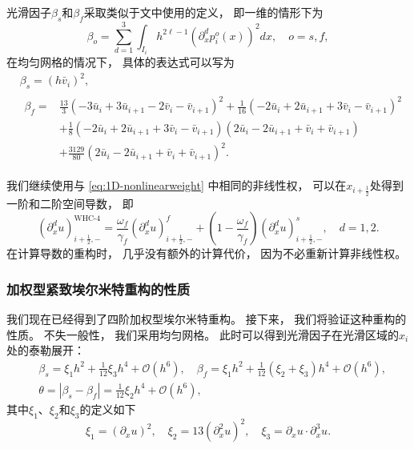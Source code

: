 光滑因子$\beta_{{s}}$和$\beta_{{f}}$采取类似于文\cite{WENO-1996}中使用的定义，
即一维的情形下为
\begin{equation}
  \beta_{{o}}= \sum_{d=1}^3 \int_{I_{i}}h^{2\ell-1}\left({\partial_{x}^{d}}p^{{o}}_{i}(x)\right)^2 dx, \quad {{o}}={{s}},{{f}},
\end{equation}
在均匀网格的情况下，
具体的表达式可以写为
\begin{align}
   & \beta_{{s}}=
  (h \bar v_{i})^2,                                                                                                                                            \\
   & \begin{aligned}
       \beta_{{f}}=
        & \frac{13}{3}\left(-3 \bar u_{i}+ 3 \bar u_{i+1}- 2 \bar v_{i}-\bar v_{i+1}\right)^2 +
       \frac{1}{16}\left(-2 \bar u_{i}+ 2 \bar u_{i+1}+ 3 \bar v_{i}-\bar v_{i+1}\right)^2                                                                    \\
        & + \frac{1}{8}\left(-2 \bar u_{i}+ 2 \bar u_{i+1}+ 3 \bar v_{i}-\bar v_{i+1}\right)\left(2 \bar u_{i}- 2 \bar u_{i+1}+\bar v_{i}+\bar v_{i+1}\right) \\
        & +\frac{3129}{80} \left(2 \bar u_{i}- 2 \bar u_{i+1}+\bar v_{i}+\bar v_{i+1}\right)^2.
     \end{aligned}
\end{align}

我们继续使用与 \cref{eq:1D-nonlinearweight} 中相同的非线性权，
可以在$x_{i+\frac{1}{2}}$处得到一阶和二阶空间导数，
即
\begin{equation}
  \left({\partial_{x}^{d}}u\right)_{i+\frac{1}{2},-}^{\text{WHC-4}}= \frac{\omega_{{f}}}{\gamma_{{f}}}\left({\partial_{x}^{d}}u\right)_{i+\frac{1}{2},-}^{{f}}+ \left(1-\frac{\omega_{{f}}}{\gamma_{{f}}}\right)\left({\partial_{x}^{d}}u\right)_{i+\frac{1}{2},-}^{{s}}, \quad d=1,2.
\end{equation}
在计算导数的重构时，
几乎没有额外的计算代价，
因为不必重新计算非线性权。

\subsubsection{加权型紧致埃尔米特重构的性质}

我们现在已经得到了四阶加权型埃尔米特重构。
接下来，
我们将验证这种重构的性质。
不失一般性，
我们采用均匀网格。
此时可以得到光滑因子在光滑区域的$x_{i}$处的泰勒展开：
\begin{equation}
  \label{eq:1D-Taylor}
  \begin{aligned}
     & \beta_{{s}}=\xi_1 h^2+\frac{1}{12}\xi_3 h^4+{\mathcal{O}}(h^6), \quad
    \beta_{{f}}=\xi_1 h^2 +\frac{1}{12}(\xi_2+\xi_3) h^4 +{\mathcal{O}}(h^6),        \\
     & \theta = |\beta_{{s}}-\beta_{{f}}|=\frac{1}{12}\xi_2 h^4+{\mathcal{O}}(h^6),
  \end{aligned}
\end{equation}
其中$\xi_1$、$\xi_2$和$\xi_3$的定义如下
\begin{equation}
  \xi_1=\left({\partial_{x}}u\right)^2, \quad
  \xi_2=13\left({\partial_{x}^2}u\right)^2, \quad
  \xi_3={\partial_{x}}u \cdot {\partial_{x}^3} u.
\end{equation}

